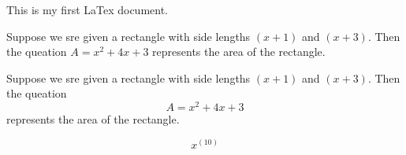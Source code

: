 \documentclass[10pt]{article}
\begin{document}
This is my first LaTex document.

Suppose we sre given a rectangle with side lengths $(x+1)$ and $(x+3)$. Then the queation $A=x^2+4x+3$ represents the area of the rectangle.

Suppose we sre given a rectangle with side lengths $(x+1)$ and $(x+3)$. Then the queation $$A=x^2+4x+3$$ represents the area of the rectangle.

$$x^(10)$$
\end{document}
